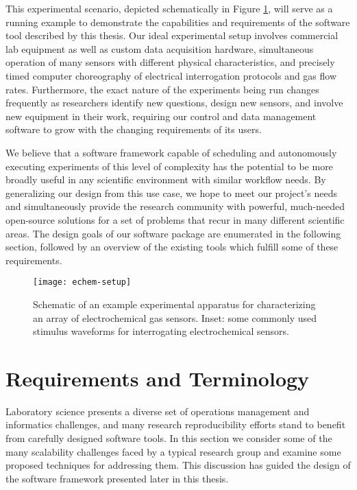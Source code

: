 \documentclass[../thesis]{subfiles}
\begin{document}
This experimental scenario, depicted schematically in Figure
\ref{fig:EchemSetup},
will serve as a running example to demonstrate the
capabilities and requirements of the software tool described by this
thesis. Our ideal experimental setup involves commercial lab equipment
as well as custom data acquisition hardware, simultaneous operation of
many sensors with different physical characteristics, and precisely
timed computer choreography of electrical interrogation protocols and
gas flow rates. Furthermore, the exact nature of the experiments being
run changes frequently as researchers identify new questions, design
new sensors, and involve new equipment in their work,
requiring our control and data management software to grow with the
changing requirements of its users.

We believe that a software framework capable of scheduling and
autonomously executing experiments of this level of complexity has the
potential to be more broadly useful in any scientific environment with
similar workflow needs. By generalizing our design from this use case,
we hope to meet our project's needs and simultaneously provide the
research community with powerful, much-needed open-source solutions
for a set of problems that recur in many different scientific areas.
The design goals of our software package are enumerated in the
following section, followed by an overview of the existing tools which
fulfill some of these requirements.

\begin{figure}
  \texttt{[image: echem-setup]}
  \caption[Electrochemical sensor characterization]{
    Schematic of an example experimental apparatus for
    characterizing an array of electrochemical gas sensors.
    Inset: some commonly used stimulus waveforms for interrogating
    electrochemical sensors.
    \label{fig:EchemSetup}
  }
\end{figure}



\section{Requirements and Terminology}
Laboratory science presents a diverse set of operations management and
informatics challenges, and many research reproducibility efforts stand to
benefit from carefully designed software tools. In this section we
consider some of the many scalability challenges faced by a typical
research group and examine some proposed techniques for addressing
them. This discussion has guided the design of the software framework
presented later in this thesis.
\end{document}
